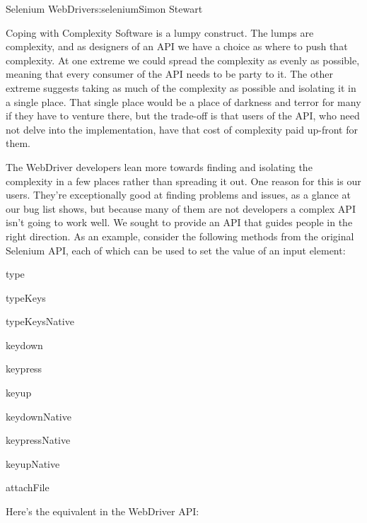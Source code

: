 \begin{aosachapter}{Selenium WebDriver}{s:selenium}{Simon Stewart}
\begin{aosasect1}{Coping with Complexity}
Software is a lumpy construct. The lumps are complexity, and as
designers of an API we have a choice as where to push that
complexity. At one extreme we could spread the complexity as evenly as
possible, meaning that every consumer of the API needs to be party to
it. The other extreme suggests taking as much of the complexity as
possible and isolating it in a single place. That single place would
be a place of darkness and terror for many if they have to venture
there, but the trade-off is that users of the API, who need not delve
into the implementation, have that cost of complexity paid up-front
for them.

The WebDriver developers lean more towards finding and isolating the
complexity in a few places rather than spreading it out. One reason
for this is our users. They're exceptionally good at finding problems
and issues, as a glance at our bug list shows, but because many of
them are not developers a complex API isn't going to work well. We
sought to provide an API that guides people in the right direction. As
an example, consider the following methods from the original Selenium
API, each of which can be used to set the value of an input element:

\begin{aosaitemize}

\item type

\item typeKeys

\item typeKeysNative

\item keydown

\item keypress

\item keyup

\item keydownNative

\item keypressNative

\item keyupNative

\item attachFile

\end{aosaitemize}

Here's the equivalent in the WebDriver API:

\begin{aosaitemize}


\end{aosaitemize}
\end{aosasect1}
\end{aosachapter}
